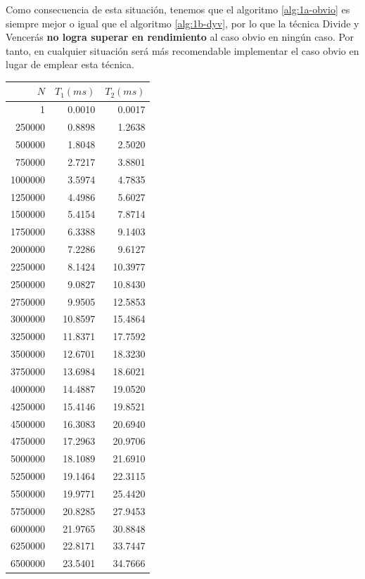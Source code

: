 Como consecuencia de esta situación, tenemos que el algoritmo \ref{alg:1a-obvio} es siempre mejor o igual 
que el algoritmo \ref{alg:1b-dyv}, por lo que la técnica Divide y Vencerás \textbf{no logra superar en 
rendimiento} al caso obvio en ningún caso. Por tanto, en cualquier situación será más recomendable
implementar el caso obvio en lugar de emplear esta técnica. 

\begin{table}
	\footnotesize
	\centering
	\begin{tabular}{|r|r|r|}
        \hline
        $N$ & $T_1 (ms)$ & $T_2 (ms)$ \\
        \hline
		1 & 0.0010 & 0.0017 \\ 
		250000 & 0.8898 & 1.2638 \\ 
		500000 & 1.8048 & 2.5020 \\ 
		750000 & 2.7217 & 3.8801 \\ 
		1000000 & 3.5974 & 4.7835 \\ 
		1250000 & 4.4986 & 5.6027 \\ 
		1500000 & 5.4154 & 7.8714 \\ 
		1750000 & 6.3388 & 9.1403 \\ 
		2000000 & 7.2286 & 9.6127 \\ 
		2250000 & 8.1424 & 10.3977 \\ 
		2500000 & 9.0827 & 10.8430 \\ 
		2750000 & 9.9505 & 12.5853 \\ 
		3000000 & 10.8597 & 15.4864 \\ 
		3250000 & 11.8371 & 17.7592 \\ 
		3500000 & 12.6701 & 18.3230 \\ 
		3750000 & 13.6984 & 18.6021 \\ 
		4000000 & 14.4887 & 19.0520 \\ 
		4250000 & 15.4146 & 19.8521 \\ 
		4500000 & 16.3083 & 20.6940 \\ 
		4750000 & 17.2963 & 20.9706 \\ 
		5000000 & 18.1089 & 21.6910 \\ 
		5250000 & 19.1464 & 22.3115 \\ 
		5500000 & 19.9771 & 25.4420 \\ 
		5750000 & 20.8285 & 27.9453 \\ 
		6000000 & 21.9765 & 30.8848 \\ 
		6250000 & 22.8171 & 33.7447 \\ 
		6500000 & 23.5401 & 34.7666 \\ 

\end{tabular}
\end{table}
